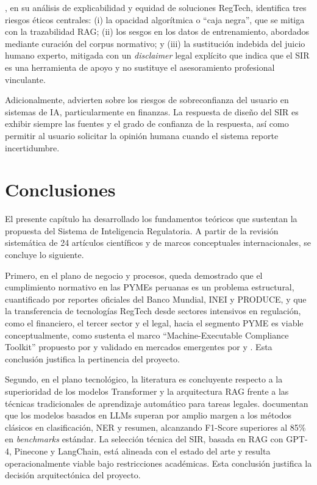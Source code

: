 \documentclass[12pt,a4paper,oneside]{report}
\begin{document}
\textcite{siering2022}, en su análisis de explicabilidad y equidad de soluciones RegTech, identifica tres riesgos éticos centrales: (i) la opacidad algorítmica o \enquote{caja negra}, que se mitiga con la trazabilidad RAG; (ii) los sesgos en los datos de entrenamiento, abordados mediante curación del corpus normativo; y (iii) la sustitución indebida del juicio humano experto, mitigada con un \textit{disclaimer} legal explícito que indica que el SIR es una herramienta de apoyo y no sustituye el asesoramiento profesional vinculante.

Adicionalmente, \textcite{eluwole2022} advierten sobre los riesgos de sobreconfianza del usuario en sistemas de IA, particularmente en finanzas. La respuesta de diseño del SIR es exhibir siempre las fuentes y el grado de confianza de la respuesta, así como permitir al usuario solicitar la opinión humana cuando el sistema reporte incertidumbre.

\section{Conclusiones}\label{sec:conclusiones-marco-teorico}

El presente capítulo ha desarrollado los fundamentos teóricos que sustentan la propuesta del Sistema de Inteligencia Regulatoria. A partir de la revisión sistemática de 24 artículos científicos y de marcos conceptuales internacionales, se concluye lo siguiente.

Primero, en el plano de negocio y procesos, queda demostrado que el cumplimiento normativo en las PYMEs peruanas es un problema estructural, cuantificado por reportes oficiales del Banco Mundial, INEI y PRODUCE, y que la transferencia de tecnologías RegTech desde sectores intensivos en regulación, como el financiero, el tercer sector y el legal, hacia el segmento PYME es viable conceptualmente, como sustenta el marco \enquote{Machine-Executable Compliance Toolkit} propuesto por \textcite{singh2022} y validado en mercados emergentes por \textcite{sarabdeen2023} y \textcite{cruzrambaud2022}. Esta conclusión justifica la pertinencia del proyecto.

Segundo, en el plano tecnológico, la literatura es concluyente respecto a la superioridad de los modelos Transformer y la arquitectura RAG frente a las técnicas tradicionales de aprendizaje automático para tareas legales. \textcite{noronha2025} documentan que los modelos basados en LLMs superan por amplio margen a los métodos clásicos en clasificación, NER y resumen, alcanzando F1-Score superiores al 85\% en \textit{benchmarks} estándar. La selección técnica del SIR, basada en RAG con GPT-4, Pinecone y LangChain, está alineada con el estado del arte y resulta operacionalmente viable bajo restricciones académicas. Esta conclusión justifica la decisión arquitectónica del proyecto.
\end{document}
